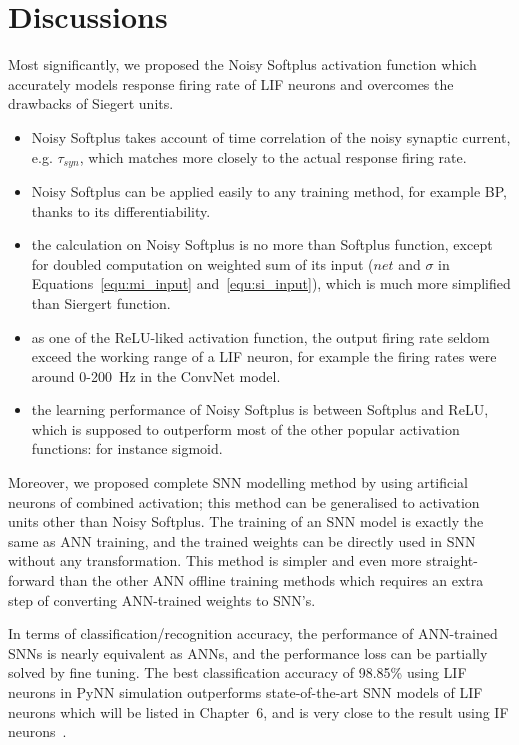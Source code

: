 \documentclass{article}
\begin{document}
\section{Discussions}
	Most significantly, we proposed the Noisy Softplus activation function which accurately models response firing rate of LIF neurons and overcomes the drawbacks of Siegert units.
\begin{itemize}
	\item Noisy Softplus takes account of time correlation of the noisy synaptic current, e.g. $\tau_{syn}$, which matches more closely to the actual response firing rate.
	
	\item Noisy Softplus can be applied easily to any training method, for example BP, thanks to its differentiability.
	
	\item the calculation on Noisy Softplus is no more than Softplus function, except for doubled computation on weighted sum of its input ($net$ and $\sigma$ in Equations~\ref{equ:mi_input} and~\ref{equ:si_input}), which is much more simplified than Siergert function.
	
	\item as one of the ReLU-liked activation function, the output firing rate seldom exceed the working range of a LIF neuron, for example the firing rates were around 0-200~Hz in the ConvNet model.
	
	\item the learning performance of Noisy Softplus is between Softplus and ReLU, which is supposed to outperform most of the other popular activation functions: for instance sigmoid.
\end{itemize}
Moreover, we proposed complete SNN modelling method by using artificial neurons of combined activation;
this method can be generalised to activation units other than Noisy Softplus.
The training of an SNN model is exactly the same as ANN training, and the trained weights can be directly used in SNN without any transformation.
This method is simpler and even more straight-forward than the other ANN offline training methods which requires an extra step of converting ANN-trained weights to SNN's.

In terms of classification/recognition accuracy, the performance of ANN-trained SNNs is nearly equivalent as ANNs, and the performance loss can  be partially solved by fine tuning.
The best classification accuracy of 98.85\% using LIF neurons in PyNN simulation outperforms state-of-the-art SNN models of LIF neurons which will be listed in Chapter~6, and is very close to the result using IF neurons~\cite{diehl2015fast}.
\end{document}
